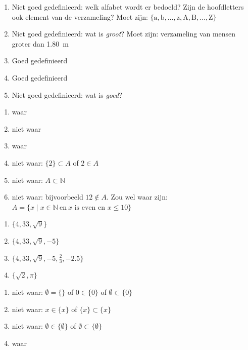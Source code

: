 \begin{Oplossing}{1.1}
\begin{enumerate}
\item Niet goed gedefinieerd: welk alfabet wordt er bedoeld? Zijn de hoofdletters ook element van de verzameling? Moet zijn: $\{\text{a},\text{b},\dots,\text{z},\text{A},\text{B},\dots,\text{Z}\}$
\item Niet goed gedefinieerd: wat is \emph{groot}? Moet zijn: verzameling van mensen groter dan \SI{1.80}{\meter}
\item Goed gedefinieerd
\item Goed gedefinieerd
\item Niet goed gedefinieerd: wat is \emph{goed}?
\end{enumerate}
\end{Oplossing}
\begin{Oplossing}{1.2}
\begin{enumerate}
\item waar
\item niet waar
\item waar
\item niet waar: $\{2\}\subset A$ of $2\in A$
\item niet waar: $A\subset \mathbb{N}$
\item niet waar: bijvoorbeeld $12\not \in A$. Zou wel waar zijn: $A=\{x\mid x\in \mathbb{N} \mathrm{~en~}x\text{~is~even en }x\leqslant 10\}$
\end{enumerate}
\end{Oplossing}
\begin{Oplossing}{1.3}
\begin{enumerate}
\item $\{ 4,33,\sqrt{9}\}$
\item $\{ 4,33,\sqrt{9},-5\}$
\item $\{ 4,33,\sqrt{9},-5,\frac 23,-2.5\}$
\item $\{\sqrt{2},\pi\}$
\end{enumerate}
\end{Oplossing}
\begin{Oplossing}{1.4}
\begin{enumerate}
\item niet waar: $\emptyset=\{ \}$ of  $0\in \{0\}$ of $\emptyset\subset\{0\}$
\item niet waar: $x\in \{x\}$ of $\{x\}\subset \{x\}$
\item niet waar: $\emptyset\in\{\emptyset\}$ of $\emptyset\subset\{\emptyset\}$
\item waar
\end{enumerate}
\end{Oplossing}
